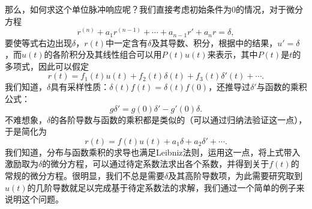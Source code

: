 那么，如何求这个单位脉冲响应呢？我们直接考虑初始条件为$0$的情况，对于微分方程
\begin{equation}
    r^{(n)}+a_{1}r^{(n-1)}+\cdots +a_{n-1} r'+a_n r=\delta,
\end{equation}
要使等式右边出现$\delta$，$r(t)$中一定含有$\delta$及其导数、积分，根据中的结果，$u'=\delta$，而$u(t)$的各阶积分及其线性组合可以用$P(t)u(t)$来表示，其中$P(t)$是$t$的多项式，因此可以假定
\begin{equation}\label{eq:ode_ansatz}
    r(t)=f_1(t)u(t)+f_2(t)\delta(t)+f_3(t)\delta'(t)+\cdots.
\end{equation}
我们知道，$\delta$具有采样性质：$\delta(t)f(t)=\delta(t)f(0)$，还推导过$\delta'$与函数的乘积公式：
\begin{equation}
    g\delta'=g(0)\delta'-g'(0)\delta.
\end{equation}
不难想象，$\delta$的各阶导数与函数的乘积都是类似的（可以通过归纳法验证这一点），于是简化为
\begin{equation}
    r(t)=f(t)u(t)+a_1\delta+a_2\delta'+\cdots.
\end{equation}
我们知道，分布与函数乘积的求导也满足Leibniz法则，运用这一点，将上式带入激励取为$\delta$的微分方程，可以通过待定系数法求出各个系数，并得到关于$f(t)$的常规的微分方程。很明显，我们不总是需要$\delta$及其高阶导数项，为此需要研究取到$u(t)$的几阶导数就足以完成基于待定系数法的求解，我们通过一个简单的例子来说明这个问题。

